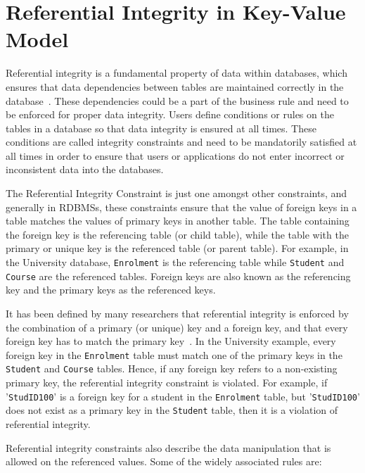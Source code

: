\section{Referential Integrity in Key-Value
Model}\label{s:referential-integrity} 

Referential integrity is a fundamental property of data within databases,  
which ensures that data dependencies between tables are maintained correctly in
the database~\citep{blaha,date,Navathe,george}.  These dependencies
could be a part of the business rule and need to be enforced for proper data integrity.  Users define
conditions or rules on the tables in a database so that data integrity is
ensured at all times.  These conditions are called integrity constraints and
need to be mandatorily satisfied at all times in order to ensure that users or
applications do not enter incorrect or inconsistent data into the databases.

The Referential Integrity Constraint is just one amongst other constraints,  
and generally in \acp{RDBMS},   these constraints ensure that the value of
foreign keys in a table matches the values of primary keys in another table. 
The table containing the foreign key is the referencing table (or child table),
while the table with the primary or unique key is the referenced table (or
parent table).
For example,   in the University database,   \texttt{Enrolment} is the
referencing table while \texttt{Student} and \texttt{Course} are the referenced
tables.  Foreign keys are also known as the referencing key and
the primary keys as the referenced keys. 

It has been defined by many researchers that referential integrity is enforced
by the combination of a primary (or unique) key and a foreign key,   and that
every foreign key has to match the primary
key~\citep{blaha,Navathe,george,pathivada}.
In the University example,   every foreign key in the \texttt{Enrolment} table must
match one of the primary keys in the \texttt{Student} and \texttt{Course}
tables.
Hence,   if any foreign key refers to a non-existing primary key,   the
referential integrity constraint is violated.   For example,   if
'\texttt{StudID100}' is a foreign key for a student in the \texttt{Enrolment}
table,   but '\texttt{StudID100}' does not exist as a primary key in the
\texttt{Student} table,   then it is a violation of referential integrity.
 
Referential integrity constraints also describe the data manipulation that is
allowed on the referenced values.  Some of the widely associated rules are:

